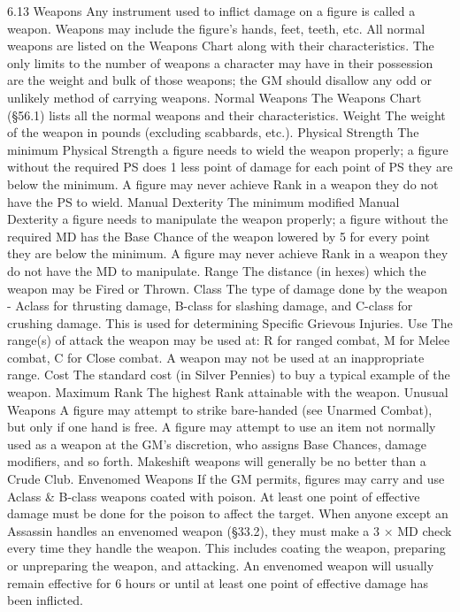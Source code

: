 \documentclass[a4paper]{article}
\begin{document}
\begin{multicols}{3}
6.13 Weapons
Any instrument used to inflict damage on a figure
is called a weapon. Weapons may include the
figure’s hands, feet, teeth, etc. All normal weapons
are listed on the Weapons Chart along with their
characteristics. The only limits to the number of
weapons a character may have in their possession
are the weight and bulk of those weapons; the GM
should disallow any odd or unlikely method of
carrying weapons.
Normal Weapons
The Weapons Chart (§56.1) lists all the normal
weapons and their characteristics.
Weight The weight of the weapon in pounds (excluding scabbards, etc.).
Physical Strength The minimum Physical
Strength a figure needs to wield the weapon properly; a figure without the required PS does 1 less
point of damage for each point of PS they are
below the minimum. A figure may never achieve
Rank in a weapon they do not have the PS to wield.
Manual Dexterity The minimum modified Manual Dexterity a figure needs to manipulate the
weapon properly; a figure without the required MD
has the Base Chance of the weapon lowered by 5
for every point they are below the minimum. A
figure may never achieve Rank in a weapon they
do not have the MD to manipulate.
Range The distance (in hexes) which the weapon
may be Fired or Thrown.
Class The type of damage done by the weapon - Aclass for thrusting damage, B-class for slashing
damage, and C-class for crushing damage. This is
used for determining Specific Grievous Injuries.
Use The range(s) of attack the weapon may be
used at: R for ranged combat, M for Melee combat,
C for Close combat. A weapon may not be used at
an inappropriate range.
Cost The standard cost (in Silver Pennies) to buy a
typical example of the weapon.
Maximum Rank The highest Rank attainable with
the weapon.
Unusual Weapons
A figure may attempt to strike bare-handed (see
Unarmed Combat), but only if one hand is free. A
figure may attempt to use an item not normally
used as a weapon at the GM’s discretion, who
assigns Base Chances, damage modifiers, and so
forth. Makeshift weapons will generally be no
better than a Crude Club.
Envenomed Weapons
If the GM permits, figures may carry and use Aclass & B-class weapons coated with poison. At
least one point of effective damage must be done
for the poison to affect the target.
When anyone except an Assassin handles an envenomed weapon (§33.2), they must make a 3 ×
MD check every time they handle the weapon.
This includes coating the weapon, preparing or
unpreparing the weapon, and attacking. An envenomed weapon will usually remain effective for 6
hours or until at least one point of effective damage
has been inflicted.


\end{multicols}
\end{document}
